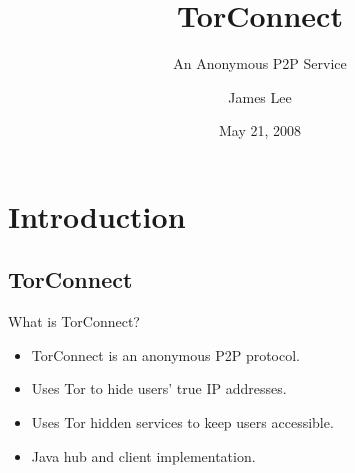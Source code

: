 \documentclass{beamer}
\title{TorConnect}
\subtitle{An Anonymous P2P Service}
\author{James Lee}
\institute{University of Maryland, Baltimore County}
\date{May 21, 2008}
\begin{document}
\begin{frame}
\titlepage
\end{frame}

\section{Introduction}
\subsection{TorConnect}
\begin{frame}{What is TorConnect?}
\begin{itemize}
\item  TorConnect is an anonymous P2P protocol.

\pause
\item Uses Tor to hide users' true IP addresses.

\pause
\item Uses Tor hidden services to keep users accessible.

\pause
\item Java hub and client implementation.
\end{itemize}
\end{frame}
\end{document}
